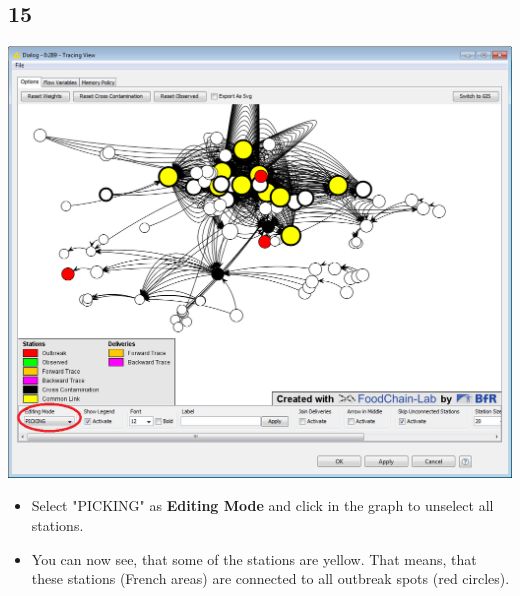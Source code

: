 \documentclass{beamer}
\begin{document}
\subsection{15}
\begin{frame}
	\begin{center}
  		\includegraphics[height=0.6\textheight]{15.png}
	\end{center}
	\begin{itemize}
		\item Select "PICKING" as \textbf{Editing Mode} and click in the graph to unselect all stations.
		\item You can now see, that some of the stations are yellow. That means, that these stations (French areas) are connected to all outbreak spots (red circles).
	\end{itemize}
\end{frame}
\end{document}
